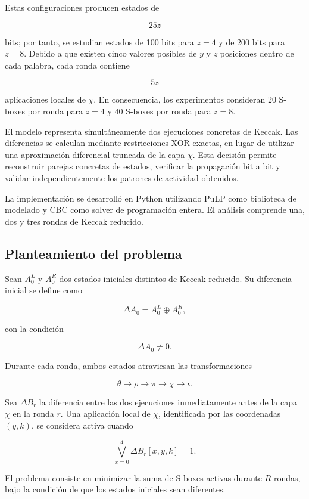Estas configuraciones producen estados de

\[
25z
\]

bits; por tanto, se estudian estados de 100 bits para $z=4$ y de 200 bits
para $z=8$. Debido a que existen cinco valores posibles de $y$ y $z$
posiciones dentro de cada palabra, cada ronda contiene

\[
5z
\]

aplicaciones locales de $\chi$. En consecuencia, los experimentos consideran
20 S-boxes por ronda para $z=4$ y 40 S-boxes por ronda para $z=8$.

El modelo representa simultáneamente dos ejecuciones concretas de Keccak.
Las diferencias se calculan mediante restricciones XOR exactas, en lugar de
utilizar una aproximación diferencial truncada de la capa $\chi$. Esta
decisión permite reconstruir parejas concretas de estados, verificar la
propagación bit a bit y validar independientemente los patrones de actividad
obtenidos.

La implementación se desarrolló en Python utilizando PuLP como biblioteca
de modelado y CBC como solver de programación entera. El análisis comprende
una, dos y tres rondas de Keccak reducido.


\subsection{Planteamiento del problema}
\label{subsec:planteamiento}

Sean $A_0^L$ y $A_0^R$ dos estados iniciales distintos de Keccak reducido.
Su diferencia inicial se define como

\[
\Delta A_0 = A_0^L \oplus A_0^R,
\]

con la condición

\[
\Delta A_0 \neq 0.
\]

Durante cada ronda, ambos estados atraviesan las transformaciones

\[
\theta \longrightarrow \rho \longrightarrow \pi
\longrightarrow \chi \longrightarrow \iota.
\]

Sea $\Delta B_r$ la diferencia entre las dos ejecuciones inmediatamente
antes de la capa $\chi$ en la ronda $r$. Una aplicación local de $\chi$,
identificada por las coordenadas $(y,k)$, se considera activa cuando

\[
\bigvee_{x=0}^{4} \Delta B_r[x,y,k] = 1.
\]

El problema consiste en minimizar la suma de S-boxes activas durante $R$
rondas, bajo la condición de que los estados iniciales sean diferentes.

